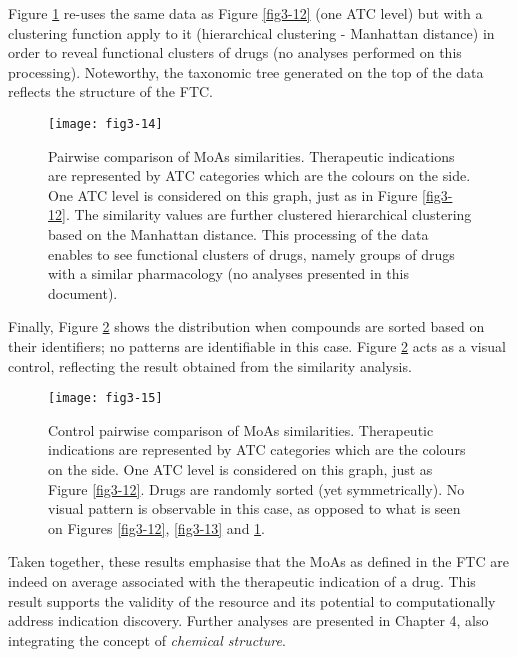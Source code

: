 Figure \ref{fig3-14} re-uses the same data as Figure \ref{fig3-12} (one ATC level) but with a clustering function apply to it (hierarchical clustering - Manhattan distance) in order to reveal functional clusters of drugs (no analyses performed on this processing). Noteworthy, the taxonomic tree generated on the top of the data reflects the structure of the FTC.

\begin{figure}[H]
    \centering
    \texttt{[image: fig3-14]}
    \caption{Pairwise comparison of MoAs similarities. Therapeutic indications are represented by ATC categories which are the colours on the side. One ATC level is considered on this graph, just as in Figure \ref{fig3-12}. The similarity values are further clustered hierarchical clustering based on the Manhattan distance. This processing of the data enables to see functional clusters of drugs, namely groups of drugs with a similar pharmacology (no analyses presented in this document).}
    \label{fig3-14}
\end{figure}

Finally, Figure \ref{fig3-15} shows the distribution when compounds are sorted based on their identifiers; no patterns are identifiable in this case. Figure \ref{fig3-15} acts as a visual control, reflecting the result obtained from the similarity analysis.

\begin{figure}[H]
    \centering
    \texttt{[image: fig3-15]}
    \caption{Control pairwise comparison of MoAs similarities. Therapeutic indications are represented by ATC categories which are the colours on the side. One ATC level is considered on this graph, just as Figure \ref{fig3-12}. Drugs are randomly sorted (yet symmetrically). No visual pattern is observable in this case, as opposed to what is seen on Figures \ref{fig3-12}, \ref{fig3-13} and \ref{fig3-14}.}
    \label{fig3-15}
\end{figure}

Taken together, these results emphasise that the MoAs as defined in the FTC are indeed on average associated with the therapeutic indication of a drug. This result supports the validity of the resource and its potential to computationally address indication discovery. Further analyses are presented in Chapter 4, also integrating the concept of \emph{chemical structure}.

